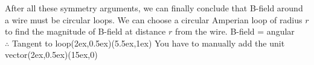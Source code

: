 \documentclass[class=article, crop=false, 12pt]{standalone}
\begin{document}
\begin{example}
\begin{enumerate}
    \end{enumerate}

    After all these symmetry arguments,
    we can finally conclude that B-field around a wire must be circular loops. 
    We can choose a circular Amperian loop of radius $r$ to find the magnitude of B-field
    at distance $r$ from the wire.
    {\scriptsize B-field = angular \\[-1ex]\scriptsize $\therefore$ Tangent to loop}{(2ex,0.5ex)}{(5.5ex,1ex)}
    {\scriptsize You have to manually add the unit vector}{(2ex,0.5ex)}{(15ex,0)}


\end{example}
\end{document}
